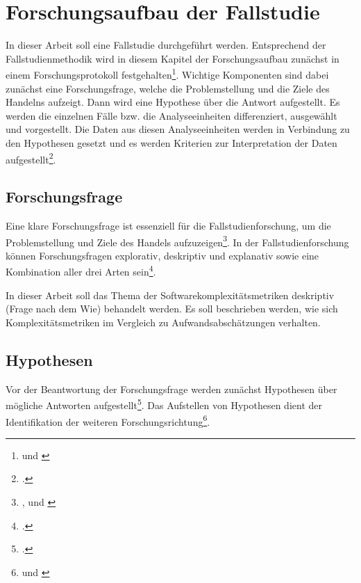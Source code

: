 \chapter{Forschungsaufbau der Fallstudie}\label{forschungsaufbau-der-fallstudie}

In dieser Arbeit soll eine Fallstudie durchgeführt werden. Entsprechend
der Fallstudienmethodik wird in diesem Kapitel der Forschungsaufbau
zunächst in einem Forschungsprotokoll festgehalten\footnote{\cite[Vgl. ][S. 8]{gothlichFallstudienAlsForschungsmethode2003} und \cite[S. 69f]{millsEncyclopediaCaseStudy2010}}. Wichtige Komponenten sind dabei
zunächst eine Forschungsfrage, welche die Problemstellung und die Ziele
des Handelns aufzeigt. Dann wird eine Hypothese über die Antwort
aufgestellt. Es werden die einzelnen Fälle bzw. die Analyseeinheiten
differenziert, ausgewählt und vorgestellt. Die Daten aus diesen
Analyseeinheiten werden in Verbindung zu den Hypothesen gesetzt und es
werden Kriterien zur Interpretation der Daten aufgestellt\footcite[Vgl. ][S. 69f]{millsEncyclopediaCaseStudy2010}.

\section{Forschungsfrage}\label{forschungsfrage}

Eine klare Forschungsfrage ist essenziell für die Fallstudienforschung,
um die Problemstellung und Ziele des Handels aufzuzeigen\footnote{\cite[Vgl. ][S. 605]{dubeRigorInformationSystems2003}, \cite[S. 70]{millsEncyclopediaCaseStudy2010} und \cite[][S. 607]{dubeRigorInformationSystems2003}}. In der
Fallstudienforschung können Forschungsfragen explorativ, deskriptiv und
explanativ sowie eine Kombination aller drei Arten sein\footcite[Vgl. ][S. 605]{dubeRigorInformationSystems2003}.

In dieser Arbeit soll das Thema der Softwarekomplexitätsmetriken
deskriptiv (Frage nach dem Wie) behandelt werden. Es soll beschrieben
werden, wie sich Komplexitätsmetriken im Vergleich zu
Aufwandsabschätzungen verhalten.

\section{Hypothesen}\label{hypothesen}

Vor der Beantwortung der Forschungsfrage werden zunächst Hypothesen über
mögliche Antworten aufgestellt\footcite[Vgl. ][S. 8]{gothlichFallstudienAlsForschungsmethode2003}. Das Aufstellen von
Hypothesen dient der Identifikation der weiteren Forschungsrichtung\footnote{\cite[Vgl. ][S. 607]{dubeRigorInformationSystems2003} und \cite[][S. 70]{millsEncyclopediaCaseStudy2010}}.

